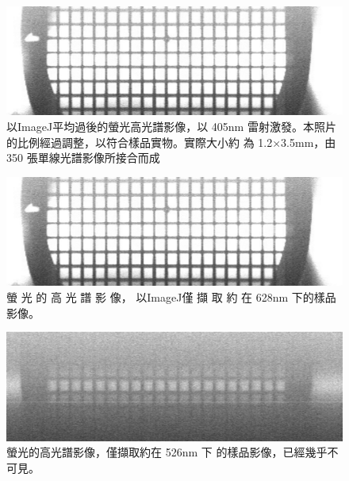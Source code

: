 \documentclass[12pt]{article}
\begin{document}
\begin{figure}
    \centering
    \includegraphics[width = 0.9\linewidth]{1211_10um_15msLaser-1.jpg}
    \caption[以ImageJ平均過後的螢光高光譜影像]{以ImageJ平均過後的螢光高光譜影像，以 405nm 雷射激發。本照片的比例經過調整，以符合樣品實物。實際大小約
    為 1.2×3.5mm，由 350 張單線光譜影像所接合而成}
    \label{fig: flourenceAvg}
\end{figure}

\begin{figure}
    \centering
    \includegraphics[width = 0.9\linewidth]{1211_10um_15msLaser-1.jpg}
    \caption[螢光的高光譜影像]{螢 光 的 高 光 譜 影 像， 以ImageJ僅 擷 取 約 在
    628nm 下的樣品影像。}
    \label{fig: flourence628}
\end{figure}

\begin{figure}
    \centering
    \includegraphics[width = 0.9\linewidth]{1211_10um_15msLaser.tiff137-1.jpg}
    \caption[螢 光 的 高 光 譜 影 像(526nm)]{螢光的高光譜影像，僅擷取約在 526nm 下
    的樣品影像，已經幾乎不可見。}
    \label{fig: flourence526}
\end{figure}
\end{document}
